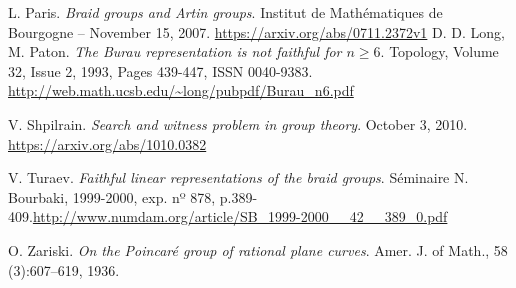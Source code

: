 \documentclass[TFG.tex]{subfiles}
\begin{document}
\begin{thebibliography}{}
 L. Paris. \textit{Braid groups and Artin groups}. Institut de Mathématiques de Bourgogne – November 15, 2007. \url{https://arxiv.org/abs/0711.2372v1}
D. D. Long, M. Paton.
\emph{The Burau representation is not faithful for $n ≥ 6$}.
Topology,
Volume 32, Issue 2,
1993,
Pages 439-447,
ISSN 0040-9383. \url{http://web.math.ucsb.edu/~long/pubpdf/Burau_n6.pdf}

 V. Shpilrain. \emph{Search and witness problem in group theory}. October 3, 2010. \url{https://arxiv.org/abs/1010.0382}

 V. Turaev. \emph{Faithful linear representations of the braid groups}. Séminaire N. Bourbaki, 1999-2000, exp. nº 878, p.389-409.\url{http://www.numdam.org/article/SB_1999-2000__42__389_0.pdf}

 O. Zariski. \emph{On the Poincaré group of rational plane curves}. Amer. J.
of Math., 58 (3):607–619, 1936.



















\end{thebibliography}
\end{document}
